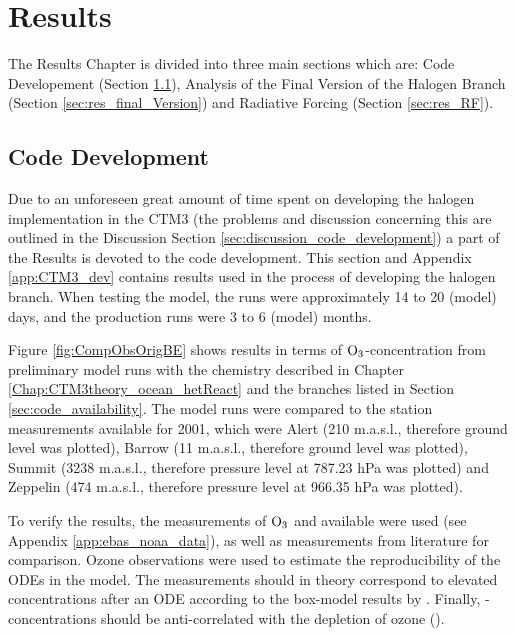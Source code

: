 \setcounter{chapter}{5}
\chapter{Results}\label{chap:results}

The Results Chapter is divided into three main sections which are: Code Developement (Section \ref{sec:results_code_development}), Analysis of the Final Version of the Halogen Branch (Section \ref{sec:res_final_Version}) and Radiative Forcing (Section \ref{sec:res_RF}). 

\section{Code Development}\label{sec:results_code_development}

Due to an unforeseen great amount of time spent on developing the halogen implementation in the CTM3 (the problems and discussion concerning this are outlined in the Discussion Section \ref{sec:discussion_code_development}) a part of the Results is devoted to the code development. This section and Appendix \ref{app:CTM3_dev} contains results used in the process of developing the halogen branch. When testing the model, the runs were approximately 14 to 20 (model) days, and the production runs were 3 to 6 (model) months.

\medskip

Figure \ref{fig:CompObsOrigBE} shows results in terms of $\mathrm{O_3}$-concentration from preliminary model runs with the chemistry described in Chapter \ref{Chap:CTM3theory_ocean_hetReact} and the branches listed in Section \ref{sec:code_availability}. The model runs were compared to the station measurements available for 2001, which were Alert (210 m.a.s.l., therefore ground level was plotted), Barrow (11 m.a.s.l., therefore ground level was plotted), Summit (3238 m.a.s.l., therefore pressure level at 787.23 hPa was plotted) and Zeppelin (474 m.a.s.l., therefore pressure level at 966.35 hPa was plotted). 

\medskip

To verify the results, the measurements of $\mathrm{O_3}$ and  available were used (see Appendix \ref{app:ebas_noaa_data}), as well as  measurements from literature for comparison. Ozone observations were used to estimate the reproducibility of the ODEs in the model. The  measurements should in theory correspond to elevated concentrations after an ODE according to the box-model results by \cite{CAO}. Finally, -concentrations should be anti-correlated with the depletion of ozone (\cite{barrie}). 

